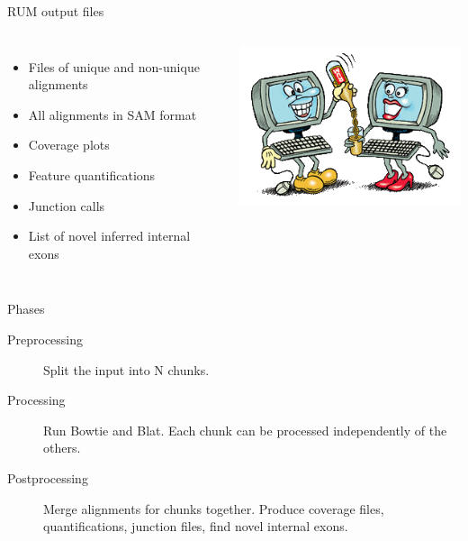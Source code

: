 \documentclass{beamer}
\begin{document}
\begin{frame}{RUM output files}
  \begin{columns}
    \column{2.5in}
\begin{itemize}
  \item Files of unique and non-unique alignments
  \item All alignments in SAM format
  \item Coverage plots
  \item Feature quantifications
  \item Junction calls
  \item List of novel inferred internal exons
\end{itemize}
\column{2.5in}
\includegraphics[scale=0.4]{rumpouring2.png}
  \end{columns}

\end{frame}

\begin{frame}{Phases}
  \begin{description}
    \item [Preprocessing] 
      Split the input into N chunks.
      \pause
    \item [Processing] Run Bowtie and Blat. Each chunk can be
      processed independently of the others.
      \pause
    \item [Postprocessing] Merge alignments for chunks
      together. Produce coverage files, quantifications, junction
      files, find novel internal exons.
  \end{description}
\end{frame}
\end{document}
